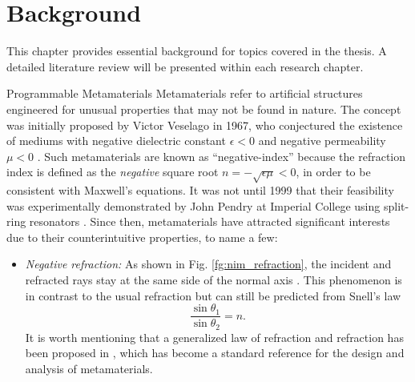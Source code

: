 
\graphicspath{{assets/chapter_2/}}

\chapter{Background}\label{ch:background}

This chapter provides essential background for topics covered in the thesis. A detailed literature review will be presented within each research chapter.

\begin{section}{}
	\begin{subsection}{Programmable Metamaterials}
		Metamaterials refer to artificial structures engineered for unusual properties that may not be found in nature.
		The concept was initially proposed by Victor Veselago in 1967, who conjectured the existence of mediums with negative dielectric constant $\epsilon < 0$ and negative permeability $\mu < 0$ \cite{Veselago1968}.
		Such metamaterials are known as ``negative-index'' because the refraction index is defined as the \emph{negative} square root $n = - \sqrt{\epsilon \mu} < 0$, in order to be consistent with Maxwell's equations.
		It was not until 1999 that their feasibility was experimentally demonstrated by John Pendry at Imperial College using split-ring resonators \cite{Pendry1999}.
		Since then, metamaterials have attracted significant interests due to their counterintuitive properties, to name a few:
		\begin{itemize}
			\item \emph{Negative refraction:} As shown in Fig. \ref{fg:nim_refraction}, the incident and refracted rays stay at the same side of the normal axis \cite{Veselago1968}. This phenomenon is in contrast to the usual refraction but can still be predicted from Snell's law
			\begin{equation}
				\frac{\sin \theta_1}{\sin \theta_2} = n.
			\end{equation}
			It is worth mentioning that a generalized law of refraction and refraction has been proposed in \cite{Yu2011}, which has become a standard reference for the design and analysis of metamaterials.
			\begin{figure}[H]
				\centering
\end{figure}
\end{itemize}
\end{subsection}
\end{section}

